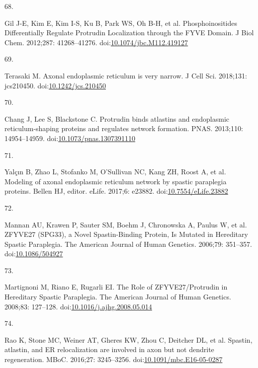 \documentclass[
  12pt,
  a4paper,
]{book}
\newlength{\cslhangindent}
\newlength{\csllabelwidth}
\newlength{\cslentryspacingunit} %
\newenvironment{CSLReferences}[2] %
 {%
  \setlength{\parindent}{0pt}
  \ifodd #1
  \let\oldpar\par
  \def\par{\hangindent=\cslhangindent\oldpar}
  \fi
  \setlength{\parskip}{#2\cslentryspacingunit}
 }%
 {}
\newcommand{\CSLLeftMargin}[1]{\parbox[t]{\csllabelwidth}{#1}}
\newcommand{\CSLRightInline}[1]{\parbox[t]{\linewidth - \csllabelwidth}{#1}\break}
\begin{document}
\begin{CSLReferences}{0}{0}
\leavevmode{}%
\CSLLeftMargin{68. }%
\CSLRightInline{Gil J-E, Kim E, Kim I-S, Ku B, Park WS, Oh B-H, et al. Phosphoinositides {Differentially Regulate Protrudin Localization} through the {FYVE Domain}. J Biol Chem. 2012;287: 41268--41276. doi:\href{https://doi.org/10.1074/jbc.M112.419127}{10.1074/jbc.M112.419127}}

\leavevmode{}%
\CSLLeftMargin{69. }%
\CSLRightInline{Terasaki M. Axonal endoplasmic reticulum is very narrow. J Cell Sci. 2018;131: jcs210450. doi:\href{https://doi.org/10.1242/jcs.210450}{10.1242/jcs.210450}}

\leavevmode{}%
\CSLLeftMargin{70. }%
\CSLRightInline{Chang J, Lee S, Blackstone C. Protrudin binds atlastins and endoplasmic reticulum-shaping proteins and regulates network formation. PNAS. 2013;110: 14954--14959. doi:\href{https://doi.org/10.1073/pnas.1307391110}{10.1073/pnas.1307391110}}

\leavevmode{}%
\CSLLeftMargin{71. }%
\CSLRightInline{Yalçın B, Zhao L, Stofanko M, O'Sullivan NC, Kang ZH, Roost A, et al. Modeling of axonal endoplasmic reticulum network by spastic paraplegia proteins. Bellen HJ, editor. eLife. 2017;6: e23882. doi:\href{https://doi.org/10.7554/eLife.23882}{10.7554/eLife.23882}}

\leavevmode{}%
\CSLLeftMargin{72. }%
\CSLRightInline{Mannan AU, Krawen P, Sauter SM, Boehm J, Chronowska A, Paulus W, et al. {ZFYVE27} ({SPG33}), a {Novel Spastin-Binding Protein}, {Is Mutated} in {Hereditary Spastic Paraplegia}. The American Journal of Human Genetics. 2006;79: 351--357. doi:\href{https://doi.org/10.1086/504927}{10.1086/504927}}

\leavevmode{}%
\CSLLeftMargin{73. }%
\CSLRightInline{Martignoni M, Riano E, Rugarli EI. The {Role} of {ZFYVE27}/{Protrudin} in {Hereditary Spastic Paraplegia}. The American Journal of Human Genetics. 2008;83: 127--128. doi:\href{https://doi.org/10.1016/j.ajhg.2008.05.014}{10.1016/j.ajhg.2008.05.014}}

\leavevmode{}%
\CSLLeftMargin{74. }%
\CSLRightInline{Rao K, Stone MC, Weiner AT, Gheres KW, Zhou C, Deitcher DL, et al. Spastin, atlastin, and {ER} relocalization are involved in axon but not dendrite regeneration. MBoC. 2016;27: 3245--3256. doi:\href{https://doi.org/10.1091/mbc.E16-05-0287}{10.1091/mbc.E16-05-0287}}


\end{CSLReferences}
\end{document}
